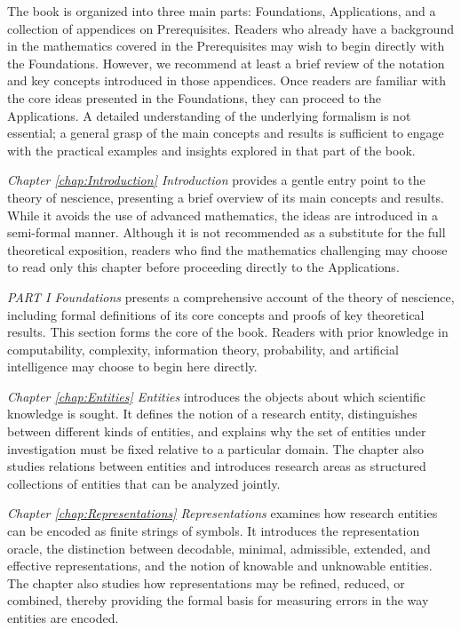 The book is organized into three main parts: Foundations, Applications, and a collection of appendices on Prerequisites. Readers who already have a background in the mathematics covered in the Prerequisites may wish to begin directly with the Foundations. However, we recommend at least a brief review of the notation and key concepts introduced in those appendices. Once readers are familiar with the core ideas presented in the Foundations, they can proceed to the Applications. A detailed understanding of the underlying formalism is not essential; a general grasp of the main concepts and results is sufficient to engage with the practical examples and insights explored in that part of the book.

\emph{Chapter \ref{chap:Introduction} Introduction} provides a gentle entry point to the theory of nescience, presenting a brief overview of its main concepts and results. While it avoids the use of advanced mathematics, the ideas are introduced in a semi-formal manner. Although it is not recommended as a substitute for the full theoretical exposition, readers who find the mathematics challenging may choose to read only this chapter before proceeding directly to the Applications.

\emph{PART I Foundations} presents a comprehensive account of the theory of nescience, including formal definitions of its core concepts and proofs of key theoretical results. This section forms the core of the book. Readers with prior knowledge in computability, complexity, information theory, probability, and artificial intelligence may choose to begin here directly.

\emph{Chapter \ref{chap:Entities} Entities} introduces the objects about which scientific knowledge is sought. It defines the notion of a research entity, distinguishes between different kinds of entities, and explains why the set of entities under investigation must be fixed relative to a particular domain. The chapter also studies relations between entities and introduces research areas as structured collections of entities that can be analyzed jointly.

\emph{Chapter \ref{chap:Representations} Representations} examines how research entities can be encoded as finite strings of symbols. It introduces the representation oracle, the distinction between decodable, minimal, admissible, extended, and effective representations, and the notion of knowable and unknowable entities. The chapter also studies how representations may be refined, reduced, or combined, thereby providing the formal basis for measuring errors in the way entities are encoded.

